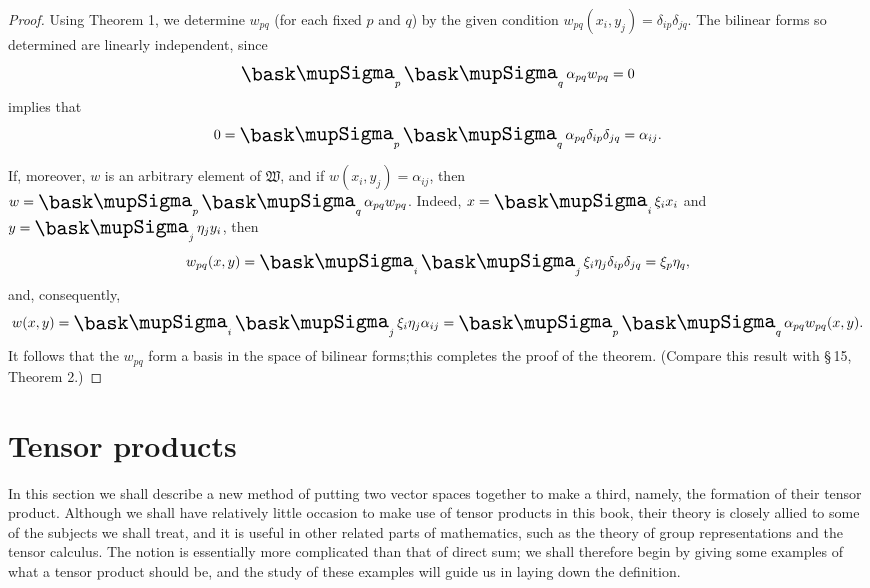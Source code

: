\begin{proof}
    Using Theorem 1, we determine \(w_{pq}\) (for each fixed \(p\) and \(q\)) by
    the given condition \(w_{pq}(x_i, y_j) = \delta_{ip}\delta_{jq}\). The
    bilinear forms so determined are linearly independent, since
    \begin{equation*}
        \sumx_p \sumx_q \alpha_{pq} w_{pq} = 0
    \end{equation*}
    implies that 
    \begin{equation*}
        0 = \sumx_p \sumx_q \alpha_{pq} \delta_{ip}\delta_{jq} = \alpha_{ij}.
    \end{equation*}

    If, moreover, \(w\) is an arbitrary element of \(\mathfrak{W}\), and if \(w(x_i,
    y_j) = \alpha_{ij}\), then \(w = \sumx_p \sumx_q \alpha_{pq} w_{pq}\).    
    Indeed, \(x = \sumx_i \xi_i x_i\) and \(y = \sumx_j \eta_j y_i\), then
    \begin{equation*}
        w_{pq}(x, y) = \sumx_i \sumx_j \xi_i \eta_j \delta_{ip}\delta_{jq} = \xi_p \eta_q,
    \end{equation*}
    and, consequently,
    \begin{equation*}
        w(x, y) = \sumx_i \sumx_j \xi_i \eta_j \alpha_{ij} = \sumx_p \sumx_q \alpha_{pq} w_{pq}(x, y).
    \end{equation*}
    It follows that the \(w_{pq}\) form a basis in the space of bilinear
    forms;this completes the proof of the theorem. (Compare this result with
    §\,15, Theorem 2.)
\end{proof}

\section{Tensor products}

In this section we shall describe a new method of putting two vector spaces
together to make a third, namely, the formation of their tensor product.
Although we shall have relatively little occasion to make use of tensor products
in this book, their theory is closely allied to some of the subjects we shall
treat, and it is useful in other related parts of mathematics, such as the
theory of group representations and the tensor calculus. The notion is
essentially more complicated than that of direct sum; we shall therefore begin
by giving some examples of what a tensor product should be, and the study of
these examples will guide us in laying down the definition.

